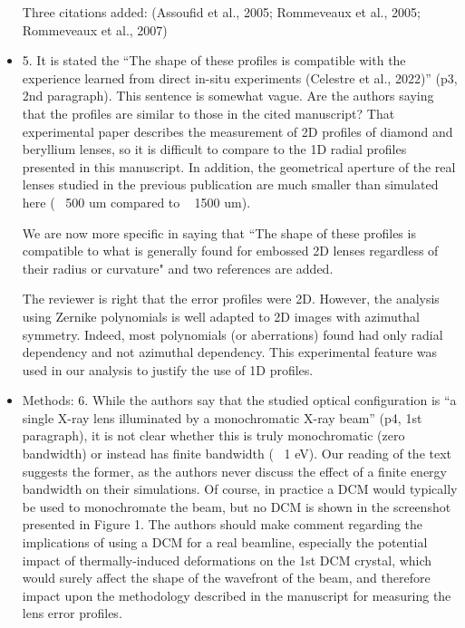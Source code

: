 \documentclass[11pt]{letter} %
\newcommand{\inred}[1]{{\color{red}#1}}
\begin{document}
\begin{letter}{}
\begin{itemize}
    \inred{Three citations added: (Assoufid et al., 2005; Rommeveaux et al., 2005; Rommeveaux et al., 2007)}
    

    \item 5. It is stated the “The shape of these profiles is compatible with the experience learned from direct in-situ experiments (Celestre et al., 2022)” (p3, 2nd paragraph). This sentence is somewhat vague. Are the authors saying that the profiles are similar to those in the cited manuscript? That experimental paper describes the measurement of 2D profiles of diamond and beryllium lenses, so it is difficult to compare to the 1D radial profiles presented in this manuscript. In addition, the geometrical aperture of the real lenses studied in the previous publication are much smaller than simulated here (~ 500 um compared to ~ 1500 um).
    
    \inred{
    We are now more specific in saying that ``The shape of these profiles is compatible to what is generally found for embossed 2D lenses regardless of their radius or curvature" and two references are added. 
    
    The reviewer is right that the error profiles were 2D. However, the analysis using Zernike polynomials is well adapted to 2D images with azimuthal symmetry. Indeed, most polynomials (or aberrations) found had only radial dependency and not azimuthal dependency. This experimental feature was used in our analysis to justify the use of 1D profiles. }
    

    \item Methods: 6. While the authors say that the studied optical configuration is “a single X-ray lens illuminated by a monochromatic X-ray beam” (p4, 1st paragraph), it is not clear whether this is truly monochromatic (zero bandwidth) or instead has finite bandwidth (~ 1 eV). Our reading of the text suggests the former, as the authors never discuss the effect of a finite energy bandwidth on their simulations. Of course, in practice a DCM would typically be used to monochromate the beam, but no DCM is shown in the screenshot presented in Figure 1. The authors should make comment regarding the implications of using a DCM for a real beamline, especially the potential impact of thermally-induced deformations on the 1st DCM crystal, which would surely affect the shape of the wavefront of the beam, and therefore impact upon the methodology described in the manuscript for measuring the lens error profiles.
    

\end{itemize}
\end{letter}
\end{document}
